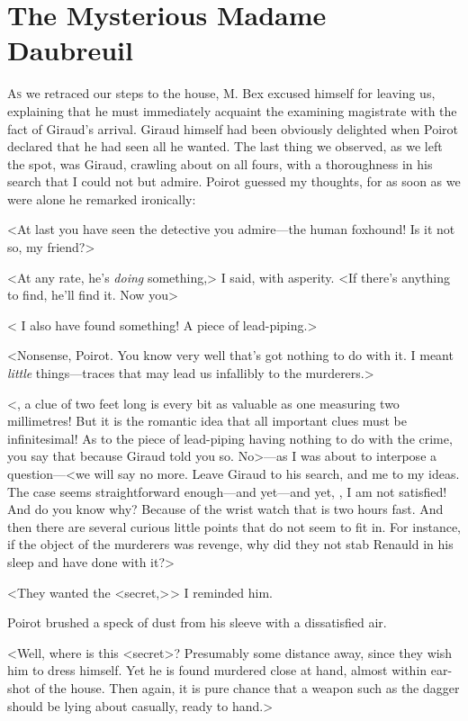 \chapter{The Mysterious Madame Daubreuil}

\lettrine{A}{s} we retraced our steps to the house, M. Bex excused himself for leaving us, explaining that he must immediately acquaint the examining magistrate with the fact of Giraud's arrival. Giraud himself had been obviously delighted when Poirot declared that he had seen all he wanted. The last thing we observed, as we left the spot, was Giraud, crawling about on all fours, with a thoroughness in his search that I could not but admire. Poirot guessed my thoughts, for as soon as we were alone he remarked ironically: 

 <At last you have seen the detective you admire—the human foxhound! Is it not so, my friend?> 

 <At any rate, he's \emph{doing} something,> I said, with asperity. <If there's anything to find, he'll find it. Now you\longdash> 

 < I also have found something! A piece of lead-piping.> 

 <Nonsense, Poirot. You know very well that's got nothing to do with it. I meant \emph{little} things—traces that may lead us infallibly to the murderers.> 

 <, a clue of two feet long is every bit as valuable as one measuring two millimetres! But it is the romantic idea that all important clues must be infinitesimal! As to the piece of lead-piping having nothing to do with the crime, you say that because Giraud told you so. No>—as I was about to interpose a question—<we will say no more. Leave Giraud to his search, and me to my ideas. The case seems straightforward enough—and yet—and yet, , I am not satisfied! And do you know why? Because of the wrist watch that is two hours fast. And then there are several curious little points that do not seem to fit in. For instance, if the object of the murderers was revenge, why did they not stab Renauld in his sleep and have done with it?> 

 <They wanted the <secret,> > I reminded him. 

 Poirot brushed a speck of dust from his sleeve with a dissatisfied air. 

 <Well, where is this <secret>? Presumably some distance away, since they wish him to dress himself. Yet he is found murdered close at hand, almost within ear-shot of the house. Then again, it is pure chance that a weapon such as the dagger should be lying about casually, ready to hand.> 

